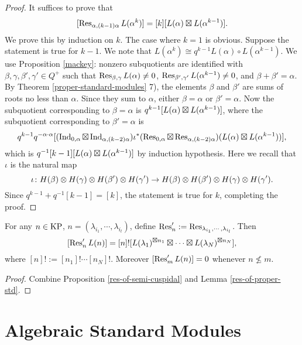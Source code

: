 \begin{proof}
    It suffices to prove that $$[\operatorname{Res}_{\alpha,(k-1)\alpha}L(\alpha^k)]
     = [k][L(\alpha)\boxtimes L(\alpha^{k-1})].$$
    We prove this by induction on $k$. The case where $k = 1$ is
    obvious. Suppose the statement is true for $k-1$. We note that
    $L(\alpha^k)\cong q^{k-1}L(\alpha)\circ L(\alpha^{k-1})$.
    We use Proposition \ref{mackey}: nonzero subquotients are 
    identified with $\beta,\gamma,\beta',\gamma'\in Q^+$ such that
    $\operatorname{Res}_{\beta,\gamma}L(\alpha)\ne 0$, $\operatorname{Res}_{\beta',\gamma'}
    L(\alpha^{k-1})\ne 0$, and $\beta+\beta' = \alpha$. By Theorem
    \ref{proper-standard-modules} 7), the elements $\beta$ and $\beta'$ are sums 
    of roots no less than $\alpha$. Since they sum to $\alpha$,
    either $\beta = \alpha$ or $\beta' = \alpha$. Now the subquotient
    corresponding to $\beta = \alpha$ is $q^{k-1}[L(\alpha)\boxtimes 
    L(\alpha^{k-1})]$, where the subquotient
    corresponding to $\beta' = \alpha$ is 
    \[
        q^{k-1} q^{-\alpha\cdot\alpha}
        [(\operatorname{Ind}_{0,\alpha}\boxtimes\operatorname{Ind}_{\alpha,(k-2)\alpha})\iota^*
        (\operatorname{Res}_{0,\alpha}\boxtimes\operatorname{Res}_{\alpha,(k-2)\alpha})(L(\alpha)\boxtimes 
        L(\alpha^{k-1}))],
    \]    
    which is $q^{-1}[k-1][L(\alpha)\boxtimes 
    L(\alpha^{k-1})]$ by induction hypothesis.
    Here we recall that $\iota$ is the natural map 
    \[
        \iota\colon H(\beta)\otimes H(\gamma)\otimes H(\beta')\otimes H(\gamma')
        \to H(\beta)\otimes H(\beta')\otimes H(\gamma)\otimes H(\gamma').
    \] 
    Since
    $q^{k-1}+q^{-1}[k-1] = [k]$, the statement is true for $k$,
    completing the proof.
\end{proof}

\begin{corollary}\label{res'}
    For any $n\in\operatorname{KP}$, $n = (\lambda_{i_1},\cdots,\lambda_{i_l})$,
    define $\operatorname{Res}_n' := \operatorname{Res}_{\lambda_{i_1},\cdots,\lambda_{i_l}}$. 
    Then 
    \[
        [\operatorname{Res}_n'L(n)] = [n]![L(\lambda_1)^{\boxtimes n_1}\boxtimes\cdots
        \boxtimes L(\lambda_N)^{\boxtimes n_N}],
    \]    
    where $[n]! := [n_1]!\cdots[n_N]!$. Moreover $[\operatorname{Res}_m'L(n)] = 0$
    whenever $n\not\le m$.
\end{corollary}

\begin{proof}
    Combine Proposition \ref{res-of-semi-cuspidal} and Lemma 
    \ref{res-of-proper-std}.
\end{proof}

\section{Algebraic Standard Modules}

